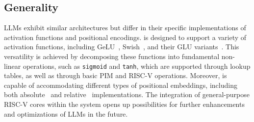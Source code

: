 \subsection{Generality}

LLMs exhibit similar architectures but differ in their specific implementations of activation functions and positional encodings. \att{} is designed to support a variety of activation functions, including GeLU~\cite{GeLU}, Swish~\cite{Swish}, and their GLU variants~\cite{SwiGLU}. This versatility is achieved by decomposing these functions into fundamental non-linear operations, such as \texttt{sigmoid} and \texttt{tanh}, which are supported through lookup tables, as well as through basic PIM and RISC-V operations. Moreover, \att{} is capable of accommodating different types of positional embeddings, including both absolute~\cite{alibi} and relative~\cite{rope-paper} implementations. The integration of general-purpose RISC-V cores within the \att{} system opens up possibilities for further enhancements and optimizations of LLMs in the future.



